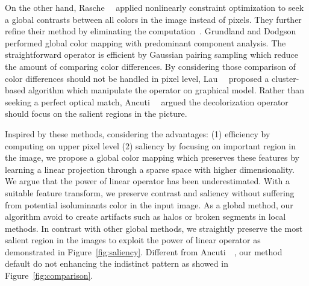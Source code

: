 On the other hand, 
Rasche~\etal~\cite{Rasche:2005:RIG} applied nonlinearly constraint optimization to seek
a global contrasts between all colors in the image instead of pixels.
They further refine their method by eliminating the computation~\cite{Rasche:2005:DPR}.
Grundland and Dodgson~\cite{Grundland:2007:DFC}
performed global color mapping with predominant component analysis.
The straightforward operator is efficient by Gaussian pairing sampling
which reduce the amount of comparing color differences.
By considering those comparison of color differences should not be handled in pixel level,
Lau~\etal~\cite{Lau:2011:CBC} proposed a cluster-based algorithm which manipulate the
operator on graphical model.
Rather than seeking a perfect optical match, Ancuti~\etal~\cite{Ancuti:2011:ESG}
argued the decolorization operator should focus on the salient regions in the picture.

Inspired by these methods, considering the advantages: 
(1) efficiency by computing on upper pixel level
(2) saliency by focusing on important region in the image,
we propose a global color mapping which preserves these
features by learning a linear projection through a sparse space with higher dimensionality.
We argue that the power of linear operator has been underestimated.
With a suitable feature transform, we preserve contrast and saliency without suffering
from potential isoluminants color in the input image.
As a global method, our algorithm avoid to create artifacts such as halos or 
broken segments in local methods.
In contrast with other global methods, we straightly preserve the most salient region
in the images to exploit the power of linear operator as demonstrated in 
Figure~\ref{fig:saliency}.
Different from Ancuti~\etal~\cite{Ancuti:2011:ESG}, our method default do not enhancing
the indistinct pattern as showed in Figure~\ref{fig:comparison}.


